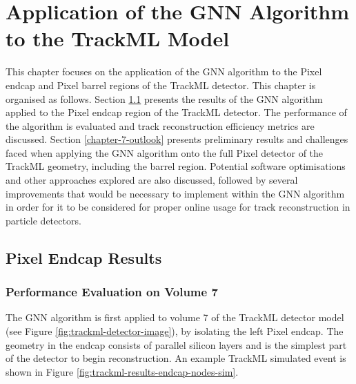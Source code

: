 
\chapter{Application of the GNN Algorithm to the TrackML Model}
\label{chapter-7}

This chapter focuses on the application of the GNN algorithm to the Pixel endcap and Pixel barrel regions of the TrackML detector. This chapter is organised as follows. Section \ref{chapter-7-endcap-results} presents the results of the GNN algorithm applied to the Pixel endcap region of the TrackML detector. The performance of the algorithm is evaluated and track reconstruction efficiency metrics are discussed. Section \ref{chapter-7-outlook} presents preliminary results and challenges faced when applying the GNN algorithm onto the full Pixel detector of the TrackML geometry, including the barrel region. Potential software optimisations and other approaches explored are also discussed, followed by several improvements that would be necessary to implement within the GNN algorithm in order for it to be considered for proper online usage for track reconstruction in particle detectors.



\section{Pixel Endcap Results}
\label{chapter-7-endcap-results}


\subsection{Performance Evaluation on Volume 7}
\label{performance-eval-endcap-vol-7-start}

The GNN algorithm is first applied to volume 7 of the TrackML detector model (see Figure \ref{fig:trackml-detector-image}), by isolating the left Pixel endcap. The geometry in the endcap consists of parallel silicon layers and is the simplest part of the detector to begin reconstruction. An example TrackML simulated event is shown in Figure \ref{fig:trackml-results-endcap-nodes-sim}.

